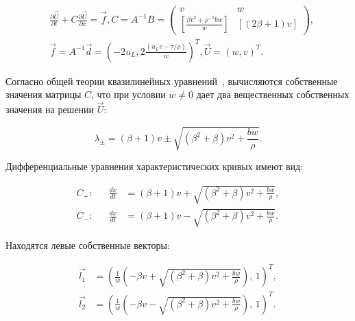 \begin{align}

&\frac{\partial \vec{U}}{\partial t} + C \frac{\partial \vec{U}}{\partial x} = \vec{f}, C = A^{-1} B = \left( \begin{matrix}v & w \\ \left[\frac{\beta v^2 + \rho^{-1} bw}{w}\right]  & \left[\left(2\beta+1\right)v\right] \end{matrix}\right), \label{eq:3_1} \\

&\vec{f}  = A^{-1} \vec{d} = \left(-2u_L, 2 \frac{\left(u_L v - \tau / \rho\right)}{w}\right)^T, \vec{U} = \left(w,v\right)^T. \label{eq:3_2}

\end{align}



Согласно общей теории квазилинейных уравнений~\cite{kulik1,rozhd1,ovsyan1,Chern1}, вычисляются собственные значения матрицы $C$, что при условии $w \neq 0$ дает два вещественных собственных значения на решении $\vec{U}$:

\begin{equation}

\lambda_{\pm} = \left(\beta + 1\right)v \pm \sqrt{\left(\beta^2 + \beta\right) v^2 + \frac{bw}{\rho}}.

\label{eq:3_3}

\end{equation}



Дифференциальные уравнения характеристических кривых имеют вид:

\begin{align}

C_+:& & \frac{dx}{dt} & = \left(\beta + 1\right)v + \sqrt{\left(\beta^2 + \beta\right) v^2 + \frac{bw}{\rho}}, \label{eq:3_4} \\

C_-:& & \frac{dx}{dt} & = \left(\beta + 1\right)v - \sqrt{\left(\beta^2 + \beta\right) v^2 + \frac{bw}{\rho}}. \label{eq:3_5}

\end{align}



Находятся левые собственные векторы:

\begin{align}

\vec{l_1} & = \left(\frac{1}{w}\left(-\beta v + \sqrt{\left(\beta^2 + \beta\right) v^2 + \frac{bw}{\rho}}\right),\, 1 \right)^T , \label{eq:3_6} \\

\vec{l_2} & = \left(\frac{1}{w}\left(-\beta v - \sqrt{\left(\beta^2 + \beta\right) v^2 + \frac{bw}{\rho}}\right),\, 1 \right)^T . \label{eq:3_7} 

\end{align}



